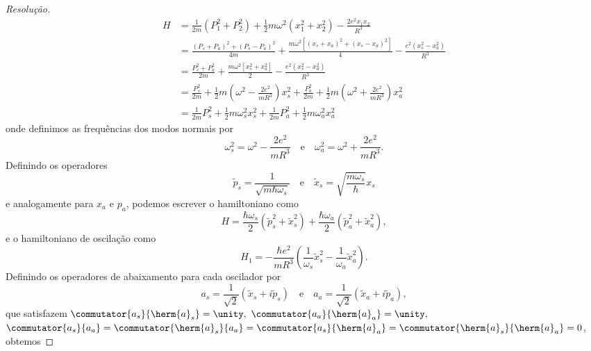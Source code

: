 \begin{proof}[Resolução]
    \begin{align*}
        H &= \frac{1}{2m}(P_1^2 + P_2^2) + \frac12 m \omega^2(x_1^2 + x_2^2) - \frac{2e^2x_1x_2}{R^3}\\
          &= \frac{(P_s + P_a)^2 + (P_s - P_a)^2}{4m} + \frac{m \omega^2\left[(x_s + x_a)^2 + (x_s - x_a)^2\right]}4  -\frac{e^2(x_s^2 - x_a^2)}{R^3}\\
          &= \frac{P_s^2 + P_a^2}{2m} + \frac{m \omega^2\left[x_s^2 + x_a^2\right]}2  -\frac{e^2(x_s^2 - x_a^2)}{R^3}\\
          &= \frac{P_s^2}{2m} + \frac12m\left(\omega^2 - \frac{2e^2}{mR^3}\right)x_s^2 + \frac{P_a^2}{2m} + \frac12 m\left(\omega^2 + \frac{2e^2}{m R^3}\right)x_a^2\\
          &= \frac{1}{2m}P_s^2 + \frac12 m \omega_s^2 x_s^2 + \frac{1}{2m}P_a^2 + \frac12 m \omega_a^2 x_a^2
    \end{align*}
    onde definimos as frequências dos modos normais por
    \begin{equation*}
        \omega_s^2 = \omega^2 - \frac{2e^2}{mR^3}\quad\text{e}\quad\omega_a^2 = \omega^2 + \frac{2e^2}{m R^3}.
    \end{equation*}
    Definindo os operadores
    \begin{equation*}
        \tilde{p}_s = \frac{1}{\sqrt{m\hbar \omega_s}}\quad\text{e}\quad \tilde{x}_s = \sqrt{\frac{m \omega_s}{\hbar}}x_s
    \end{equation*}
    e analogamente para \(x_a\) e \(p_a\), podemos escrever o hamiltoniano como
    \begin{equation*}
        H = \frac{\hbar \omega_s}{2}\left(\tilde{p}_s^2 + \tilde{x}_s^2\right) + \frac{\hbar \omega_a}{2}\left(\tilde{p}_a^2 + \tilde{x}_a^2\right),
    \end{equation*}
    e o hamiltoniano de oscilação como
    \begin{equation*}
        H_1 = -\frac{\hbar e^2}{m R^3}\left(\frac{1}{\omega_s}\tilde{x}_s^2 - \frac{1}{\omega_a}\tilde{x}_a^2\right).
    \end{equation*}
    Definindo os operadores de abaixamento para cada oscilador por
    \begin{equation*}
        a_s = \frac1{\sqrt{2}}\left(\tilde{x}_s + i\tilde{p}_s\right)
        \quad\text{e}\quad
        a_a = \frac1{\sqrt{2}}\left(\tilde{x}_a + i\tilde{p}_a\right),
    \end{equation*}
    que satisfazem \(\commutator{a_s}{\herm{a}_s} = \unity,\) \(\commutator{a_a}{\herm{a}_a} = \unity,\) \(\commutator{a_s}{a_a} = \commutator{\herm{a}_s}{a_a} = \commutator{a_s}{\herm{a}_a} = \commutator{\herm{a}_s}{\herm{a}_a} = 0\), obtemos

\end{proof}
